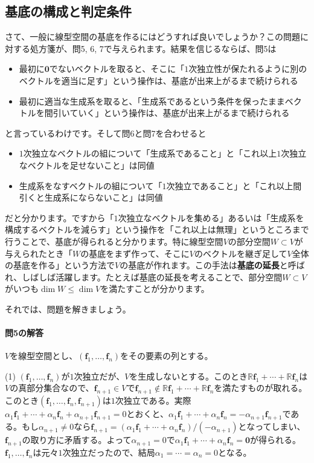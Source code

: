 \subsection{基底の構成と判定条件}

さて、一般に線型空間の基底を作るにはどうすれば良いでしょうか？この問題に対する処方箋が、問5, 6, 7で与えられます。結果を信じるならば、問5は
\begin{itemize}
\item 最初に$\bm{0}$でないベクトルを取ると、そこに「$1$次独立性が保たれるように別のベクトルを適当に足す」という操作は、基底が出来上がるまで続けられる
\item 最初に適当な生成系を取ると、「生成系であるという条件を保ったままベクトルを間引いていく」という操作は、基底が出来上がるまで続けられる
\end{itemize}
と言っているわけです。そして問6と問7を合わせると
\begin{itemize}
\item $1$次独立なベクトルの組について「生成系であること」と「これ以上$1$次独立なベクトルを足せないこと」は同値
\item 生成系をなすベクトルの組について「$1$次独立であること」と「これ以上間引くと生成系にならないこと」は同値
\end{itemize}
だと分かります。ですから「$1$次独立なベクトルを集める」あるいは「生成系を構成するベクトルを減らす」という操作を「これ以上は無理」というところまで行うことで、基底が得られると分かります。特に線型空間$V$の部分空間$W\subset V$が与えられたとき「$W$の基底をまず作って、そこに$V$のベクトルを継ぎ足して$V$全体の基底を作る」という方法で$V$の基底が作れます。この手法は\textbf{基底の延長}と呼ばれ、しばしば活躍します。たとえば基底の延長を考えることで、部分空間$W\subset V$がいつも$\dim W \leq \dim V$を満たすことが分かります。

それでは、問題を解きましょう。

\paragraph{問5の解答} $V$を線型空間とし、$(\bm{f}_1, \ldots, \bm{f}_n)$をその要素の列とする。

\noindent (1) $(\bm{f}_1, \ldots, \bm{f}_n)$が$1$次独立だが、$V$を生成しないとする。このとき$\mathbb{R}\bm{f}_1 + \cdots + \mathbb{R}\bm{f}_n$は$V$の真部分集合なので、$\bm{f}_{n+1} \in V$で$\bm{f}_{n + 1}\not\in\mathbb{R}\bm{f}_1 + \cdots + \mathbb{R}\bm{f}_n$を満たすものが取れる。このとき$(\bm{f}_1, \ldots, \bm{f}_n, \bm{f}_{n + 1})$は$1$次独立である。実際$\alpha_1\bm{f}_1 + \cdots + \alpha_n\bm{f}_n + \alpha_{n + 1}\bm{f}_{n + 1} = 0$とおくと、$\alpha_1\bm{f}_1 + \cdots + \alpha_n\bm{f}_n = -\alpha_{n + 1}\bm{f}_{n + 1}$である。もし$\alpha_{n + 1}\neq 0$なら$\bm{f}_{n + 1} = (\alpha_1\bm{f}_1 + \cdots + \alpha_n\bm{f}_n)/(-\alpha_{n + 1})$となってしまい、$\bm{f}_{n + 1}$の取り方に矛盾する。よって$\alpha_{n + 1} = 0$で$\alpha_1\bm{f}_1 + \cdots + \alpha_n\bm{f}_n = \bm{0}$が得られる。$\bm{f}_1, \ldots, \bm{f}_n$は元々$1$次独立だったので、結局$\alpha_1 = \cdots = \alpha_n = 0$となる。

